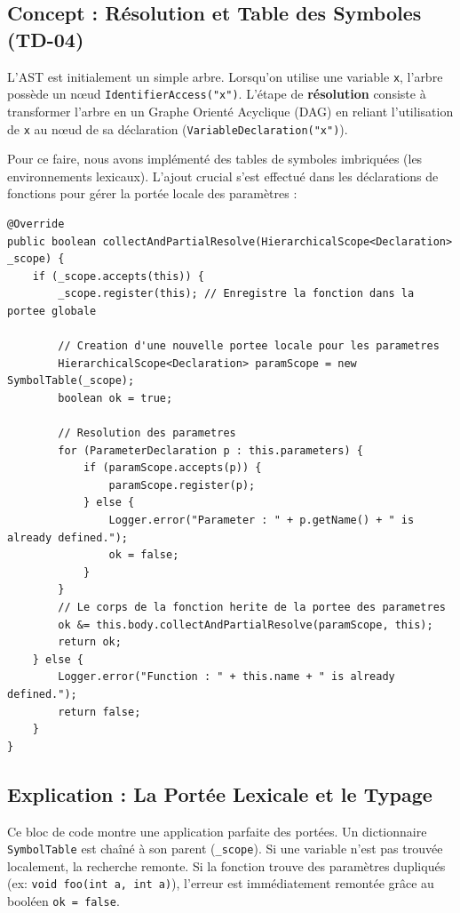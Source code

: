 \documentclass[12pt,a4paper]{article}
\begin{document}
\subsection{Concept : Résolution et Table des Symboles (TD-04)}
L'AST est initialement un simple arbre. Lorsqu'on utilise une variable \texttt{x}, l'arbre possède un nœud \texttt{IdentifierAccess("x")}. L'étape de \textbf{résolution} consiste à transformer l'arbre en un Graphe Orienté Acyclique (DAG) en reliant l'utilisation de \texttt{x} au nœud de sa déclaration (\texttt{VariableDeclaration("x")}).

Pour ce faire, nous avons implémenté des tables de symboles imbriquées (les environnements lexicaux). L'ajout crucial s'est effectué dans les déclarations de fonctions pour gérer la portée locale des paramètres :

\begin{lstlisting}[caption={Extrait de FunctionDeclaration.java - Résolution}]
@Override
public boolean collectAndPartialResolve(HierarchicalScope<Declaration> _scope) {
    if (_scope.accepts(this)) {
        _scope.register(this); // Enregistre la fonction dans la portee globale
        
        // Creation d'une nouvelle portee locale pour les parametres
        HierarchicalScope<Declaration> paramScope = new SymbolTable(_scope);
        boolean ok = true;
        
        // Resolution des parametres
        for (ParameterDeclaration p : this.parameters) {
            if (paramScope.accepts(p)) {
                paramScope.register(p);
            } else {
                Logger.error("Parameter : " + p.getName() + " is already defined.");
                ok = false;
            }
        }
        // Le corps de la fonction herite de la portee des parametres
        ok &= this.body.collectAndPartialResolve(paramScope, this);
        return ok;
    } else {
        Logger.error("Function : " + this.name + " is already defined.");
        return false;
    }
}
\end{lstlisting}

\subsection{Explication : La Portée Lexicale et le Typage}
Ce bloc de code montre une application parfaite des portées. Un dictionnaire \texttt{SymbolTable} est chaîné à son parent (\texttt{\_scope}). Si une variable n'est pas trouvée localement, la recherche remonte. Si la fonction trouve des paramètres dupliqués (ex: \texttt{void foo(int a, int a)}), l'erreur est immédiatement remontée grâce au booléen \texttt{ok = false}.
\end{document}
